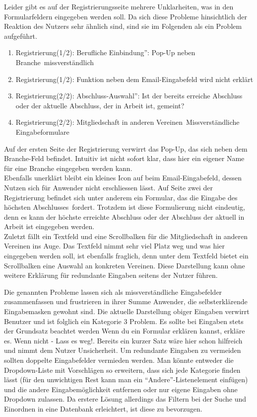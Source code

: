 { Leider gibt es auf der Registrierungsseite mehrere Unklarheiten, was in den Formularfeldern eingegeben werden soll. Da sich diese Probleme hinsichtlich der Reaktion
des Nutzers sehr ähnlich sind, sind sie im Folgenden als ein Problem aufgeführt.
\begin{enumerate}
	\item {Registrierung(1/2): \glqq Berufliche Einbindung”: Pop-Up neben \glqq Branche\grqq ~missverständlich}
	\item {Registrierung(1/2): Funktion neben dem Email-Eingabefeld wird nicht erklärt}
	\item {Registrierung(2/2): \glqq Abschluss-Auswahl”: Ist der bereits erreiche Abschluss oder der aktuelle Abschluss, der in Arbeit ist, gemeint? }
	\item {Registrierung(2/2): \glqq Mitgliedschaft in anderen Vereinen\grqq ~Missverständliche Eingabeformulare}	
\end{enumerate}	
Auf der ersten Seite der Registrierung verwirrt das Pop-Up, das sich neben dem \glqq Branche\grqq -Feld befindet. Intuitiv ist nicht sofort klar, dass hier ein eigener
Name für eine Branche eingegeben werden kann.\\
Ebenfalls unerklärt bleibt ein kleines Icon auf beim Email-Eingabefeld, dessen Nutzen sich für Anwender nicht erschliessen lässt.
Auf Seite zwei der Registrierung befindet sich unter anderem ein Formular, das die Eingabe des \glqq höchsten Abschlusses\grqq ~fordert. Trotzdem ist diese Formulierung nicht eindeutig,
denn es kann der höchste erreichte Abschluss oder der Abschluss der aktuell in Arbeit ist eingegeben werden.\\
Zuletzt fällt ein Textfeld und eine Scrollbalken für die Mitgliedschaft in anderen Vereinen ins Auge. Das Textfeld nimmt sehr viel Platz weg und was hier eingegeben werden soll, ist ebenfalls fraglich, denn unter dem Textfeld bietet ein Scrollbalken eine Auswahl an konkreten Vereinen. Diese Darstellung kann ohne weitere Erklärung für redundante Eingaben seitens der Nutzer führen.
}
{ Die genannten Probleme lassen sich als missverständliche Eingabefelder zusammenfassen und frustrieren in ihrer Summe Anwender, die selbsterklärende Eingabemasken gewohnt sind. Die aktuelle Darstellung obiger Eingaben verwirrt Benutzer und ist folglich ein Kategorie 3 Problem.
}{
Es sollte bei Eingaben stets der Grundsatz beachtet werden \glqq Wenn du ein Formular erklären kannst, erkläre es. Wenn nicht - Lass es weg!\grqq. Bereits ein kurzer Satz wäre hier schon hilfreich und nimmt dem Nutzer Unsicherheit. Um redundante Eingaben zu vermeiden sollten doppelte Eingabefelder vermieden werden. Man könnte entweder die Dropdown-Liste mit Vorschlägen so erweitern, dass sich jede Kategorie finden lässt (für den unwichtigen Rest kann man ein “Andere”-Listenelement einfügen) und die andere Eingabemöglichkeit entfernen oder nur eigene Eingaben ohne Dropdown zulassen. Da erstere Lösung allerdings das Filtern bei der Suche und Einordnen in eine Datenbank erleichtert, ist diese zu bevorzugen.}
  



